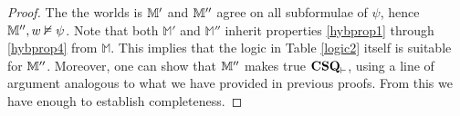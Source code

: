 \begin{proof}
  The the worlds is $\mathbbm{M}'$ and $\mathbbm{M}''$ agree on all  subformulae of $\psi$, hence $\mathbbm{M}'', w \nvDash
  \psi$. Note that both $\mathbb{M}'$ and $\mathbb{M}''$ inherit
  properties \ref{hybprop1} through \ref{hybprop4} from $\mathbb{M}$.
  This implies that the logic in Table \ref{logic2} itself 
  is suitable for $\mathbbm{M}''$. Moreover, one can show that
  $\mathbbm{M}''$ makes true $\textup{\tmtextbf{CSQ}}_{\vdash}$, using
  a line of argument analogous to what we have provided in previous proofs.
  From this we have enough to establish completeness.
\end{proof}
